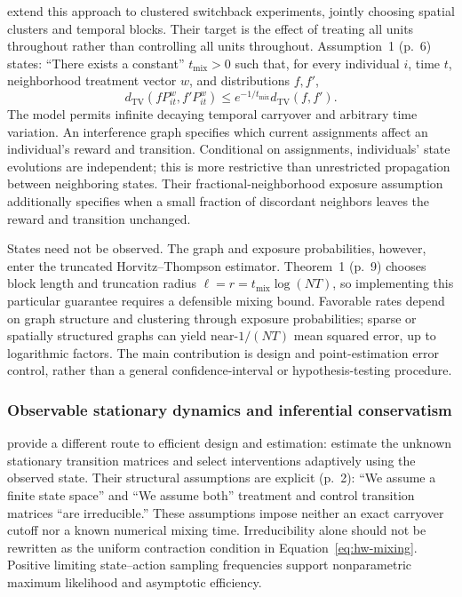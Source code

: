 \documentclass[12pt]{article}
\begin{document}
\citet{jia2025} extend this approach to clustered switchback experiments, jointly choosing spatial clusters and temporal blocks. Their target is the effect of treating all units throughout rather than controlling all units throughout. Assumption~1 (p.~6) states: ``There exists a constant'' $t_{\mathrm{mix}}>0$ such that, for every individual $i$, time $t$, neighborhood treatment vector $w$, and distributions $f,f'$,
\begin{equation}
 d_{\mathrm{TV}}(fP_{it}^{w},f'P_{it}^{w})
 \leq e^{-1/t_{\mathrm{mix}}}d_{\mathrm{TV}}(f,f').
\end{equation}
The model permits infinite decaying temporal carryover and arbitrary time variation. An interference graph specifies which current assignments affect an individual's reward and transition. Conditional on assignments, individuals' state evolutions are independent; this is more restrictive than unrestricted propagation between neighboring states. Their fractional-neighborhood exposure assumption additionally specifies when a small fraction of discordant neighbors leaves the reward and transition unchanged.

States need not be observed. The graph and exposure probabilities, however, enter the truncated Horvitz--Thompson estimator. Theorem~1 (p.~9) chooses block length and truncation radius $\ell=r=t_{\mathrm{mix}}\log(NT)$, so implementing this particular guarantee requires a defensible mixing bound. Favorable rates depend on graph structure and clustering through exposure probabilities; sparse or spatially structured graphs can yield near-$1/(NT)$ mean squared error, up to logarithmic factors. The main contribution is design and point-estimation error control, rather than a general confidence-interval or hypothesis-testing procedure.

\subsubsection{Observable stationary dynamics and inferential conservatism}

\citet{glynn2020} provide a different route to efficient design and estimation: estimate the unknown stationary transition matrices and select interventions adaptively using the observed state. Their structural assumptions are explicit (p.~2): ``We assume a finite state space'' and ``We assume both'' treatment and control transition matrices ``are irreducible.'' These assumptions impose neither an exact carryover cutoff nor a known numerical mixing time. Irreducibility alone should not be rewritten as the uniform contraction condition in Equation~\eqref{eq:hw-mixing}. Positive limiting state--action sampling frequencies support nonparametric maximum likelihood and asymptotic efficiency.
\end{document}
